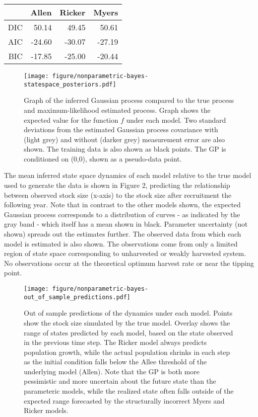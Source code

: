 \documentclass[author-year, review]{elsarticle} %
\makeatletter
\def\maxwidth{\ifdim\Gin@nat@width>\linewidth\linewidth
\else\Gin@nat@width\fi}
\let\Oldincludegraphics\includegraphics
\renewcommand{\includegraphics}[1]{\Oldincludegraphics[width=\maxwidth]{#1}}
\makeatother
\begin{document}
\begin{table}[ht]
\centering
\begin{tabular}{rrrr}
  \hline
 & Allen & Ricker & Myers \\ 
  \hline
DIC & 50.14 & 49.45 & 50.61 \\ 
  AIC & -24.60 & -30.07 & -27.19 \\ 
  BIC & -17.85 & -25.00 & -20.44 \\ 
   \hline
\end{tabular}
\end{table}

\begin{figure}[htbp]
\centering
\texttt{[image: figure/nonparametric-bayes-statespace\_posteriors.pdf]}
\caption{Graph of the inferred Gaussian process compared to the true
process and maximum-likelihood estimated process. Graph shows the
expected value for the function $f$ under each model. Two standard
deviations from the estimated Gaussian process covariance with (light
grey) and without (darker grey) measurement error are also shown. The
training data is also shown as black points. The GP is conditioned on
(0,0), shown as a pseudo-data point.}
\end{figure}

The mean inferred state space dynamics of each model relative to the
true model used to generate the data is shown in Figure 2, predicting
the relationship between observed stock size (x-axis) to the stock size
after recruitment the following year. Note that in contrast to the other
models shown, the expected Gaussian process corresponds to a
distribution of curves - as indicated by the gray band - which itself
has a mean shown in black. Parameter uncertainty (not shown) spreads out
the estimates further. The observed data from which each model is
estimated is also shown. The observations come from only a limited
region of state space corresponding to unharvested or weakly harvested
system. No observations occur at the theoretical optimum harvest rate or
near the tipping point.

\begin{figure}[htbp]
\centering
\texttt{[image: figure/nonparametric-bayes-out\_of\_sample\_predictions.pdf]}
\caption{Out of sample predictions of the dynamics under each model.
Points show the stock size simulated by the true model. Overlay shows
the range of states predicted by each model, based on the state observed
in the previous time step. The Ricker model always predicts population
growth, while the actual population shrinks in each step as the initial
condition falls below the Allee threshold of the underlying model
(Allen). Note that the GP is both more pessimistic and more uncertain
about the future state than the parameteric models, while the realized
state often falls outside of the expected range forecasted by the
structurally incorrect Myers and Ricker models.}
\end{figure}
\end{document}
